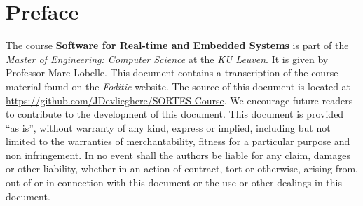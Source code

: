 \documentclass[main.tex]{subfiles}
\begin{document}
\chapter*{Preface}
The course \textbf{Software for Real-time and Embedded Systems} is part of the \emph{Master of Engineering: Computer Science} at the \emph{KU Leuven}. It is given by Professor Marc Lobelle.
\paragrah{}
This document contains a transcription of the course material found on the \emph{Foditic} website.
\paragrah{}
The source of this document is located at \url{https://github.com/JDevlieghere/SORTES-Course}. We encourage future readers to contribute to the development of this document.
\paragrah{}
This document is provided ``as is'', without warranty of any kind, express or implied, including but not limited to the warranties of merchantability, fitness for a particular purpose and non infringement.
In no event shall the authors be liable for any claim, damages or other liability, whether in an action of contract, tort or otherwise, arising from, out of or in connection with this document or the use or other dealings in this document.
\end{document}
